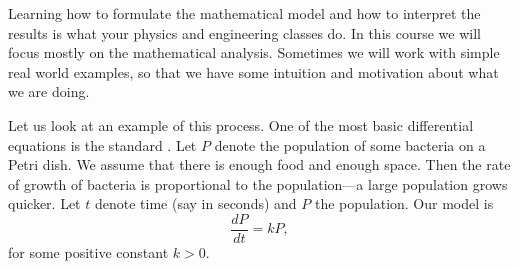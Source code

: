 \documentclass[12pt]{book}
\begin{document}
Learning how to formulate the mathematical model and how to interpret the
results is what your physics and engineering classes do.  In this
course we will focus mostly on the mathematical analysis.  Sometimes we will
work with simple real world examples, so that we have some intuition and
motivation about what we are doing.

Let us look at 
an example of this process.
One of the most basic differential equations
is the standard \emph{}.
Let $P$ denote the population 
of some bacteria on a Petri dish.  We assume that there is enough food
and enough space.  Then the rate of growth of bacteria is proportional
to the population---a large population grows quicker.  Let $t$ denote
time (say in seconds) and $P$ the population.  Our model
is
\begin{equation*}
\frac{dP}{dt} = kP ,
\end{equation*}
for some positive constant $k > 0$.
\end{document}
